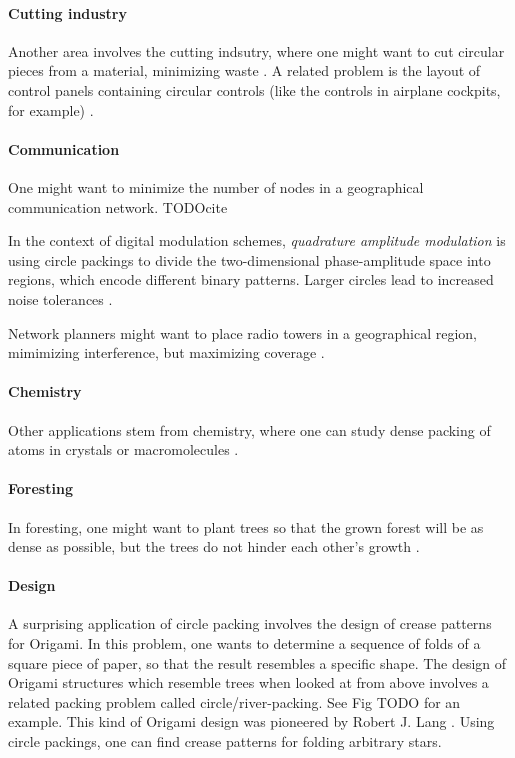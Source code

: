 \paragraph{Cutting industry}

Another area involves the cutting indsutry, where one might want to cut circular pieces from a material, minimizing waste \cite{SMCSCG2007new}.
A related problem is the layout of control panels containing circular controls (like the controls in airplane cockpits, for example) \parencite{CKP2008solving}.

\paragraph{Communication}

One might want to minimize the number of nodes in a geographical communication network. TODOcite

In the context of digital modulation schemes, \emph{quadrature amplitude modulation} is using circle packings to divide the two-dimensional phase-amplitude space into regions, which encode different binary patterns. Larger circles lead to increased noise tolerances \parencite{PWMD1992packing}.

Network planners might want to place radio towers in a geographical region, mimimizing interference, but maximizing coverage \parencite{SMCSCG2007new}.

\paragraph{Chemistry}

Other applications stem from chemistry, where one can study dense packing of atoms in crystals or macromolecules \cite{WMP1994history}.

\paragraph{Foresting}

In foresting, one might want to plant trees so that the grown forest will be as dense as possible, but the trees do not hinder each other's growth \cite{SMCSCG2007new}.

\paragraph{Design}

A surprising application of circle packing involves the design of crease patterns for Origami. In this problem, one wants to determine a sequence of folds of a square piece of paper, so that the result resembles a specific shape. The design of Origami structures which resemble trees when looked at from above involves a related packing problem called circle/river-packing. See Fig TODO for an example. This kind of Origami design was pioneered by Robert J. Lang \cite{lang1996computational}. Using circle packings, one can find crease patterns for folding arbitrary stars.

